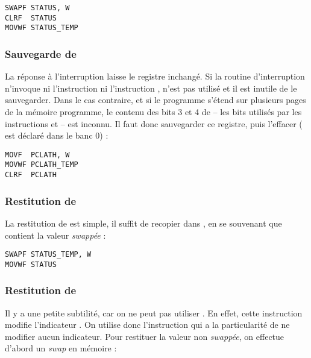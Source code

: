 \begin{lstlisting}[language=assembleur]
SWAPF STATUS, W
CLRF  STATUS
MOVWF STATUS_TEMP 
\end{lstlisting}

\subsubsection{Sauvegarde de }

La réponse à l'interruption laisse le registre  inchangé. Si la routine d'interruption n'invoque ni l'instruction  ni l'instruction ,  n'est pas utilisé et il est inutile de le sauvegarder. Dans le cas contraire, et si le programme s'étend sur plusieurs pages de la mémoire programme, le contenu des bits 3 et 4 de  -- les bits utilisés par les instructions  et  -- est inconnu. Il faut donc sauvegarder ce registre, puis l'effacer ( est déclaré dans le banc 0) :

\begin{lstlisting}[language=assembleur]
MOVF  PCLATH, W
MOVWF PCLATH_TEMP 
CLRF  PCLATH
\end{lstlisting}




\subsubsection{Restitution de }

La restitution de  est simple, il suffit de recopier  dans , en se souvenant que  contient la valeur \emph{swappée} :

\begin{lstlisting}[language=assembleur]
SWAPF STATUS_TEMP, W
MOVWF STATUS
\end{lstlisting}


\subsubsection{Restitution de }

Il y a une petite subtilité, car on ne peut pas utiliser . En effet, cette instruction modifie l'indicateur . On utilise donc l'instruction  qui a la particularité de ne modifier aucun indicateur. Pour restituer la valeur non \emph{swappée}, on effectue d'abord un \emph{swap} en mémoire :

